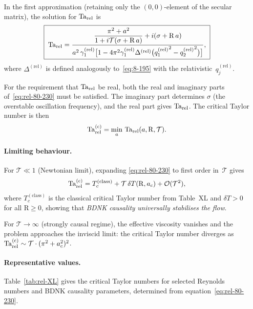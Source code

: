 In the first approximation (retaining only the $(0,0)$-element
of the secular matrix), the solution for $\mathrm{Ta}_{\mathrm{rel}}$ is
\begin{equation}
\label{eq:rel-80-230}
\boxed{\;
\Tarel = \frac{\displaystyle
  \frac{\pi^{2}+a^{2}}{1+i\mathcal{T}(\sigma+\mathrm{R}\,a)}
  + i(\sigma+\mathrm{R}\,a)}{%
  a^{2}\,\gamma_{1}^{(\mathrm{rel})}
  \bigl[1 - 4\pi^{2}\gamma_{1}^{(\mathrm{rel})}
  \Delta^{(\mathrm{rel})}
  \bigl({q_{1}^{(\mathrm{rel})}}^{2}-{q_{2}^{(\mathrm{rel})}}^{2}\bigr)
  \bigr]},
\;}
\end{equation}
where $\Delta^{(\mathrm{rel})}$ is defined analogously
to~\eqref{eq:8-195} with the relativistic~$q_{j}^{(\mathrm{rel})}$.

For the requirement that $\mathrm{Ta}_{\mathrm{rel}}$ be real, both the real and imaginary
parts of~\eqref{eq:rel-80-230} must be satisfied.  The imaginary part
determines $\sigma$ (the overstable oscillation frequency), and the
real part gives $\mathrm{Ta}_{\mathrm{rel}}$.  The critical Taylor number is then
\begin{equation}
\label{eq:rel-80-231}
\mathrm{Ta}_{\mathrm{rel}}^{(\mathrm{c})} = \min_{a}\,\mathrm{Ta}_{\mathrm{rel}}(a,\mathrm{R},\mathcal{T}).
\end{equation}

\paragraph{Limiting behaviour.}
For $\mathcal{T}\ll 1$ (Newtonian limit), expanding
\eqref{eq:rel-80-230} to first order in~$\mathcal{T}$ gives
\begin{equation}
\label{eq:rel-80-232}
\mathrm{Ta}_{\mathrm{rel}}^{(\mathrm{c})}
  = T_{c}^{(\mathrm{class})}
    + \mathcal{T}\,\delta T(\mathrm{R},a_{c})
    + \mathcal{O}(\mathcal{T}^{2}),
\end{equation}
where $T_{c}^{(\mathrm{class})}$ is the classical critical Taylor
number from Table~XL and $\delta T>0$ for all
$\mathrm{R}\ge 0$, showing that \emph{BDNK causality
universally stabilises the flow}.

For $\mathcal{T}\to\infty$ (strongly causal regime), the effective
viscosity vanishes and the problem approaches the inviscid limit:
the critical Taylor number diverges as
$\mathrm{Ta}_{\mathrm{rel}}^{(\mathrm{c})}\sim\mathcal{T}\cdot(\pi^{2}+a_{c}^{2})^{2}$.

\paragraph{Representative values.}
Table~\ref{tab:rel-XL} gives the critical Taylor numbers for selected
Reynolds numbers and BDNK causality parameters, determined
from equation~\eqref{eq:rel-80-230}.

